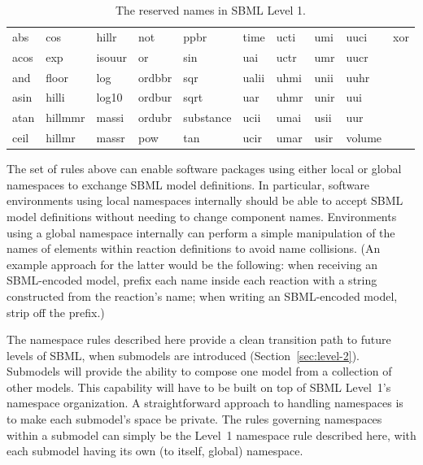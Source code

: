 \documentclass[10pt]{cekarticle}
\newenvironment{blockChanged}{\color{BrickRed}}{}
\begin{document}
\begin{table}[tbh]
  \vspace*{-5pt}
  \centering
  \ttfamily
  \begin{blockChanged}
  \begin{tabular}{llllllllll}
    \toprule  
    abs	   & cos	& hillr   & not     & ppbr	& time	& ucti & umi	& uuci	& xor\\
    acos   & exp	& isouur  & or 	    & sin	& uai	& uctr & umr	& uucr\\
    and    & floor	& log	  & ordbbr  & sqr	& ualii	& uhmi & unii	& uuhr \\
    asin   & hilli	& log10	  & ordbur  & sqrt	& uar	& uhmr & unir	& uui \\
    atan   & hillmmr	& massi	  & ordubr  & substance	& ucii	& umai & usii	& uur \\
    ceil   & hillmr	& massr	  & pow     & tan	& ucir	& umar & usir   & volume \\
    \bottomrule
  \end{tabular}
  \end{blockChanged}
  \caption{The reserved names in SBML Level 1.}
  \label{tab:reserved-names}
\end{table}

The set of rules above can enable software packages using either local or
global namespaces to exchange SBML model definitions.  In particular,
software environments using local namespaces internally should be able to
accept SBML model definitions without needing to change component names.
Environments using a global namespace internally can perform a simple
manipulation of the names of elements within reaction definitions to avoid
name collisions.  (An example approach for the latter would be the
following: when receiving an SBML-encoded model, prefix each name inside
each reaction with a string constructed from the reaction's name; when
writing an SBML-encoded model, strip off the prefix.)

The namespace rules described here provide a clean transition path to
future levels of SBML, when submodels are introduced
(Section~\ref{sec:level-2}).  Submodels will provide the ability to compose
one model from a collection of other models.  This capability will have to
be built on top of SBML Level~1's namespace organization.  A
straightforward approach to handling namespaces is to make each submodel's
space be private.  The rules governing namespaces within a submodel can
simply be the Level~1 namespace rule described here, with each submodel
having its own (to itself, global) namespace.
\end{document}
